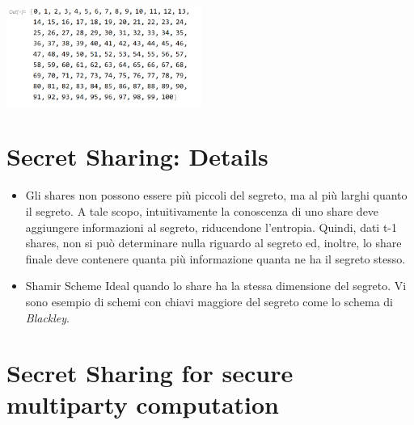 \documentclass{book}
\begin{document}
\begin{center}
	\includegraphics[width=0.48\textwidth]{2021-12-29-10-57-00.png}%
\end{center}
\section{Secret Sharing: Details}\begin{itemize}
	\item Gli shares non possono essere più piccoli del segreto, ma al più larghi quanto il segreto\@. A tale scopo, intuitivamente la conoscenza di uno share deve aggiungere informazioni al segreto, riducendone l'entropia\@. Quindi, dati t-1 shares, non si può determinare nulla riguardo al segreto ed, inoltre, lo share finale deve contenere quanta più informazione quanta ne ha il segreto stesso\@.
	\item Shamir Scheme Ideal quando lo share ha la stessa dimensione del segreto\@. Vi sono esempio di schemi con chiavi maggiore del segreto come lo schema di \emph{Blackley}\@.
\end{itemize}
\section{Secret Sharing for secure multiparty computation}
\end{document}
